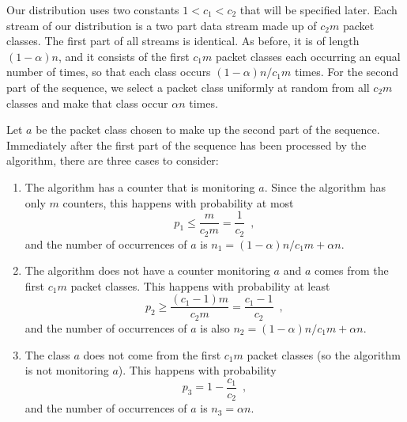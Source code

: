 \documentclass[charterfonts,lotsofwhite]{patmorin}
\begin{document}
Our distribution uses two constants $1<c_1<c_2$ that will be specified
later.  Each stream of our distribution is a two part data stream made
up of $c_2m$ packet classes.  The first part of all streams is
identical.  As before, it is of length $(1-\alpha)n$, and it consists
of the first $c_1m$ packet classes each occurring an equal number of
times, so that each class occurs $(1-\alpha)n/c_1m$ times.  For the
second part of the sequence, we select a packet class uniformly at
random from all $c_2m$ classes and make that class occur $\alpha n$
times.

Let $a$ be the packet class chosen to make up the second part of the
sequence.  Immediately after the first part of the sequence has been
processed by the algorithm, there are three cases to consider:

\begin{enumerate}
\item The algorithm has a counter that is monitoring $a$.  Since the
algorithm has only $m$ counters, this happens with probability at most
\[
   p_1 \le \frac{m}{c_2m} = \frac{1}{c_2} \enspace ,
\]
and the number of occurrences of $a$ is $n_1=(1-\alpha)n/c_1m + \alpha n$.

\item The algorithm does not have a counter monitoring $a$ and $a$ comes
from the first $c_1m$ packet classes.  This happens with probability at
least 
\[
    p_2 \ge \frac{(c_1-1)m}{c_2m} = \frac{c_1-1}{c_2} \enspace ,
\]
and the number of occurrences of $a$ is also $n_2=(1-\alpha)n/c_1m + \alpha n$.

\item The class $a$ does not come from the first $c_1m$ packet classes 
(so the algorithm is not monitoring $a$). This happens with probability
\[
    p_3 = 1-\frac{c_1}{c_2} \enspace ,
\]
and the number of occurrences of $a$ is $n_3=\alpha n$.

\end{enumerate}
\end{document}
